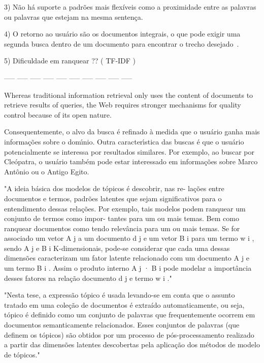 3) Não há suporte a padrões mais flexíveis como a proximidade entre as palavras ou palavras que estejam na mesma sentença.

4) O retorno ao usuário são os documentos integrais, o que pode exigir uma segunda busca dentro de um documento para encontrar o trecho desejado~\cite{Aggarwal2012,Manning2008}. 

5) Dificuldade em ranquear ?? ( TF-IDF )






----- ----- ----- ----- ----- ----- ----- ----- ----- ----- 


Whereas traditional information retrieval only uses the content of documents to
retrieve results of queries, the Web requires stronger mechanisms for quality control because
of its open nature.



Consequentemente, o alvo da busca é refinado à medida que o usuário ganha mais informações sobre o domı́nio. Outra caracterı́stica das buscas é que o usuário potencialmente se interessa por resultados similares. Por exemplo, ao buscar por Cleópatra, o usuário também pode estar interessado em informações sobre Marco Antônio ou o Antigo Egito.



"A ideia básica dos modelos de tópicos é descobrir, nas re- lações entre documentos e termos, padrões latentes que sejam significativos para o entendimento dessas relações. Por exemplo, tais modelos podem ranquear um conjunto de termos como impor- tantes para um ou mais temas. Bem como ranquear documentos como tendo relevância para um ou mais temas. Se for associado um vetor A j a um documento d j e um vetor B i para um termo w i , sendo A j e B i K-dimensionais, pode-se considerar que cada uma dessas dimensões caracterizam um fator latente relacionado com um documento A j e um termo B i . Assim o produto interno A j · B i pode modelar a importância desses fatores na relação documento d j e termo w i ."




"Nesta tese, a expressão tópico é usada levando-se em conta que o assunto tratado em uma coleção de documentos é extraído automaticamente, ou seja, tópico é definido como um conjunto de palavras que frequentemente ocorrem em documentos semanticamente relacionados. Esses conjuntos de palavras (que definem os tópicos) são obtidos por um processo de pós-processamento realizado a partir das dimensões latentes descobertas pela aplicação dos métodos de modelo de tópicos."  



